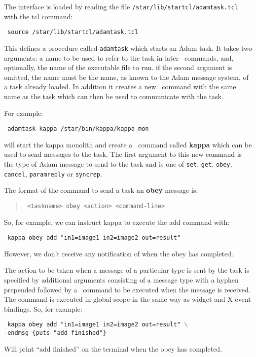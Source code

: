 The interface is loaded by reading the file
{\tt{/star/lib/startcl/adamtask.tcl}} with the tcl command:

\begin{tquote}{\tt
source /star/lib/startcl/adamtask.tcl
}\end{tquote}

This defines a procedure called {\tt adamtask} which starts an Adam 
task. It takes two arguments: a name to be used to refer to the task in later 
\Tcl\ commands, and, optionally, the name of the executable file to run. 
if the second argument is omitted, the name must be the name, as known to the
Adam message system, of a task already loaded.
In addition it 
creates a new \Tcl\ command with the same name as the task which can then be
used to communicate with the task. 

For example:
\begin{tquote}{\tt
adamtask kappa /star/bin/kappa/kappa\_mon
}\end{tquote}
will start the kappa monolith and create a \Tcl\ command called {\bf kappa} 
which can be used to send messages to the task. 
The first argument to this new command is the type of Adam message to 
send to the task and is one of {\tt set}, {\tt get}, {\tt obey}, {\tt 
cancel}, {\tt paramreply} or {\tt syncrep}.

The format of the command to send a task an {\bf obey} message is:
\begin{quote}{\tt
<taskname> obey <action> <command-line>
}\end{quote}
So, for example, we can instruct kappa to execute the add command with:
\begin{tquote}{\tt
kappa obey add "in1=image1 in2=image2 out=result"
}\end{tquote}
However, we don't receive any notification of when the obey has 
completed. 

The action to be taken when a message of a particular type is sent by the 
task is specified by additional arguments consisting of a message type 
with a hyphen prepended followed by a \Tcl\ command to be executed when the 
message is received. The command is executed in global scope in the same 
way as widget and X event bindings. So, for example:
\begin{tquote}{\tt
kappa obey add "in1=image1 in2=image2 out=result" $\backslash$\\
\hspace*{2em}-endmsg \{puts "add finished"\} 
}\end{tquote}
Will print ``add finished'' on the terminal when the obey has completed. 

